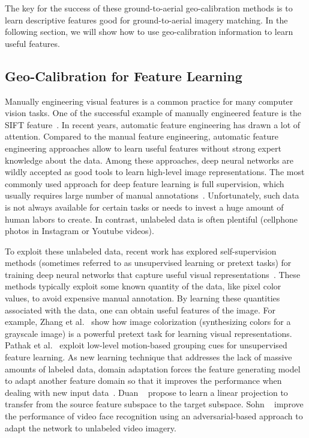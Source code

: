 The key for the success of these ground-to-aerial geo-calibration
methods is to learn descriptive features good for ground-to-aerial
imagery matching. In the following section, we will show how to use
geo-calibration information to learn useful features.

\subsection{Geo-Calibration for Feature Learning}

Manually engineering visual features is a common practice for many
computer vision tasks. One of the successful example of manually
engineered feature is the SIFT feature~\cite{lowe1999object}.
In recent years, automatic feature engineering has drawn a lot
of attention. Compared to the manual feature
engineering, automatic feature engineering approaches allow to learn
useful features without strong expert knowledge about the data. Among
these approaches, deep neural networks are wildly accepted as good
tools to learn high-level image representations.  The most commonly
used approach for deep feature learning is full supervision, which
usually requires large number of manual
annotations~\cite{yosinski2014transferable,zhou2016learning,wen2016discriminative}.
Unfortunately, such data is not always available for certain tasks or
needs to invest a huge amount of human labors to create.
In contrast, unlabeled data is often plentiful (\ie cellphone photos
in Instagram or Youtube videos).

To exploit these unlabeled data, recent work has explored
self-supervision methods (sometimes referred to as unsupervised learning or
pretext tasks) for training deep neural networks that capture useful
visual representations~\cite{doersch2015unsupervised,pathak2016context}. 
These methods typically
exploit some known quantity of the data, like pixel color values, to
avoid expensive manual annotation.
By learning these quantities associated with the data, one
can obtain useful features of the image.
For example, Zhang et al.~\cite{zhang2016colorful} show how image
colorization (synthesizing colors for a grayscale image) is a powerful
pretext task for learning visual representations. Pathak et
al.~\cite{pathak2017learning} exploit low-level motion-based grouping
cues for unsupervised feature learning.  
%
As new learning technique that addresses the lack of massive amounts
of labeled data, domain adaptation forces the feature generating model
to adapt another feature domain so that it improves the performance
when dealing with new input
data~\cite{fernando2013unsupervised,fernando2015joint,saenko2010adapting,wang2016actions,tinghui2016flow}.
Duan \etal~\cite{duan2012learning} propose to learn a linear
projection to transfer from the source feature subspace to the target
subspace. Sohn \etal~\cite{sohn2017unsupervised} improve the
performance of video face recognition using an adversarial-based
approach to adapt the network to unlabeled video imagery.

